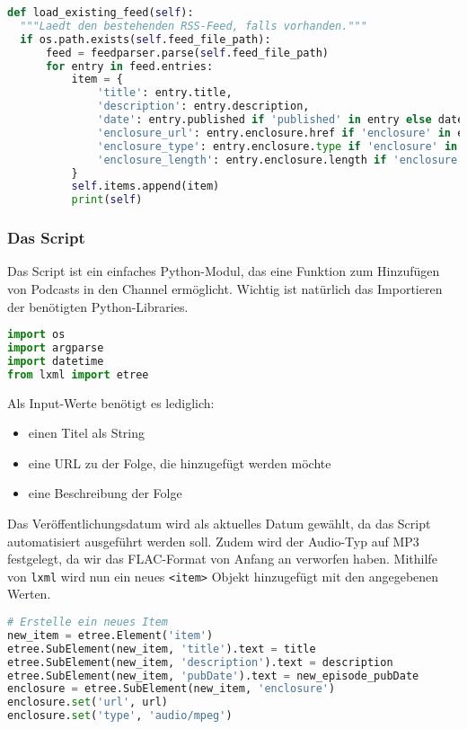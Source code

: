 \documentclass{article}
\begin{document}
\begin{lstlisting}[language=Python, caption=Feedparser Bug]
def load_existing_feed(self):
  """Laedt den bestehenden RSS-Feed, falls vorhanden."""
  if os.path.exists(self.feed_file_path):
      feed = feedparser.parse(self.feed_file_path)
      for entry in feed.entries:
          item = {
              'title': entry.title,
              'description': entry.description,
              'date': entry.published if 'published' in entry else datetime.now().isoformat(),
              'enclosure_url': entry.enclosure.href if 'enclosure' in entry else None,
              'enclosure_type': entry.enclosure.type if 'enclosure' in entry else None,
              'enclosure_length': entry.enclosure.length if 'enclosure' in entry else None
          }
          self.items.append(item)
          print(self)
\end{lstlisting}

\subsubsection{Das Script}
Das Script ist ein einfaches Python-Modul, das eine Funktion zum Hinzufügen von Podcasts in den Channel ermöglicht. Wichtig ist natürlich das Importieren der benötigten Python-Libraries.

\begin{lstlisting}[language=Python, caption=RSS-Feed Generator imports]
import os
import argparse
import datetime
from lxml import etree
\end{lstlisting}

Als Input-Werte benötigt es lediglich:

\begin{itemize}
    \item einen Titel als String
    \item eine URL zu der Folge, die hinzugefügt werden möchte
    \item eine Beschreibung der Folge
\end{itemize}

Das Veröffentlichungsdatum wird als aktuelles Datum gewählt, da das Script automatisiert ausgeführt werden soll. Zudem wird der Audio-Typ auf MP3 festgelegt, da wir das FLAC-Format von Anfang an verworfen haben. Mithilfe von \texttt{lxml} wird nun ein neues \texttt{<item>} Objekt hinzugefügt mit den angegebenen Werten.

\begin{lstlisting}[language=Python, caption=Erstellen eines neuen Feed-Items]
# Erstelle ein neues Item
new_item = etree.Element('item')
etree.SubElement(new_item, 'title').text = title
etree.SubElement(new_item, 'description').text = description
etree.SubElement(new_item, 'pubDate').text = new_episode_pubDate
enclosure = etree.SubElement(new_item, 'enclosure')
enclosure.set('url', url)
enclosure.set('type', 'audio/mpeg')
\end{lstlisting}
\end{document}
